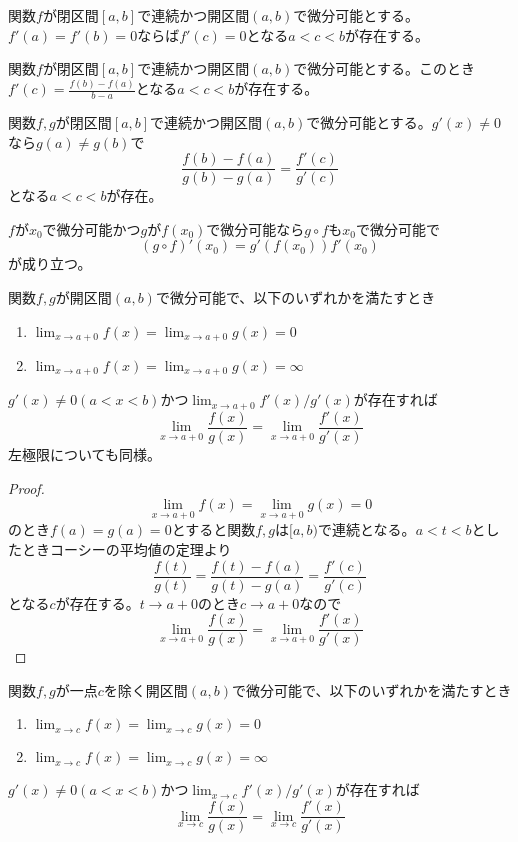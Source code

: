 	\begin{thm}[ロルの定理]
		関数$f$が閉区間$[a, b]$で連続かつ開区間$(a, b)$で微分可能とする。$f'(a) = f'(b) = 0$ならば$f'(c) = 0$となる$a < c < b$が存在する。
	\end{thm}
	\begin{thm}[平均値の定理]
		関数$f$が閉区間$[a, b]$で連続かつ開区間$(a, b)$で微分可能とする。このとき$f'(c) = \frac{f(b) - f(a)}{b - a}$となる$a < c < b$が存在する。
	\end{thm}
	\begin{thm}[コーシーの平均値の定理]
		関数$f,g$が閉区間$[a, b]$で連続かつ開区間$(a, b)$で微分可能とする。$g'(x) \neq 0$なら$g(a) \neq g(b)$で
			\[\frac{f(b) - f(a)}{g(b) - g(a)} = \frac{f'(c)}{g'(c)}\]
		となる$a < c < b$が存在。
	\end{thm}
	\begin{prop}[合成関数の微分]
		$f$が$x_0$で微分可能かつ$g$が$f(x_0)$で微分可能なら$g\circ f$も$x_0$で微分可能で
			\[(g\circ f)'(x_0) = g'(f(x_0))f'(x_0)\]
		が成り立つ。
	\end{prop}
	\begin{prop}[逆関数の微分]
	\end{prop}
	\begin{thm}[ロピタルの定理]
		関数$f,g$が開区間$(a, b)$で微分可能で、以下のいずれかを満たすとき
		\begin{enumerate}
			\item $\lim_{x \to a+0} f(x) = \lim_{x \to a+0} g(x) = 0$
			\item $\lim_{x \to a+0} f(x) = \lim_{x \to a+0} g(x) = \infty$
		\end{enumerate}
		$g'(x) \neq 0(a < x < b)$かつ$\lim_{x \to a+0} f'(x)/g'(x)$が存在すれば
			\[\lim_{x \to a+0} \frac{f(x)}{g(x)} = \lim_{x \to a+0} \frac{f'(x)}{g'(x)}\]
		左極限についても同様。
	\end{thm}
	\begin{proof}
			\[\lim_{x \to a+0} f(x) = \lim_{x \to a+0} g(x) = 0\]
		のとき$f(a) = g(a) = 0$とすると関数$f,g$は$[a, b)$で連続となる。$a < t < b$としたときコーシーの平均値の定理より
			\[\frac{f(t)}{g(t)} = \frac{f(t) - f(a)}{g(t) - g(a)} = \frac{f'(c)}{g'(c)}\]
		となる$c$が存在する。$t \to a+0$のとき$c \to a+0$なので
			\[\lim_{x \to a+0} \frac{f(x)}{g(x)} = \lim_{x \to a+0} \frac{f'(x)}{g'(x)}\]
	\end{proof}
	\begin{cor}
		関数$f,g$が一点$c$を除く開区間$(a, b)$で微分可能で、以下のいずれかを満たすとき
		\begin{enumerate}
			\item $\lim_{x \to c} f(x) = \lim_{x \to c} g(x) = 0$
			\item $\lim_{x \to c} f(x) = \lim_{x \to c} g(x) = \infty$
		\end{enumerate}
		$g'(x) \neq 0(a < x < b)$かつ$\lim_{x \to c} f'(x)/g'(x)$が存在すれば
			\[\lim_{x \to c} \frac{f(x)}{g(x)} = \lim_{x \to c} \frac{f'(x)}{g'(x)}\]
	\end{cor}

